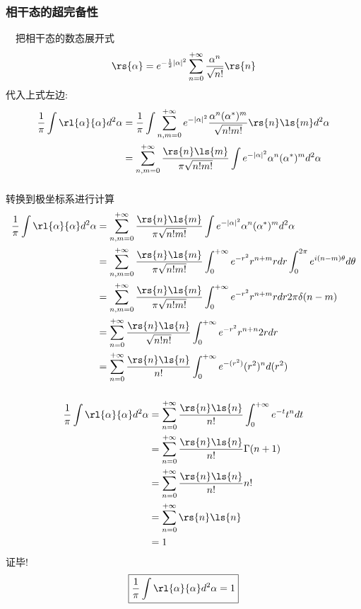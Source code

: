 \begin{frame}
 \frametitle{相干态的超完备性}
 \例[13.试证明相干态具有如下完备性关系]{
    \[ \frac{1}{\pi} \int \rl{\alpha}{\alpha}d ^2 \alpha =1 \] }
 \证 ~ 把相干态的数态展开式
    \[\rs{\alpha} = e^{-\frac{1}{2}\left|\alpha\right|^2}  \sum_{n=0} ^{+\infty}  \frac{\alpha^n}{\sqrt{n!}} \rs{n} \]
 代入上式左边:
 \[
    \begin{aligned}
        \frac{1}{\pi} \int \rl{\alpha}{\alpha}d ^2 \alpha &=  \frac{1}{\pi} \int \sum_{n,m=0} ^{+\infty} e^{-\left|\alpha\right|^2}  
        \frac{\alpha^n(\alpha^*)^m}{\sqrt{n!m!}}  \rs{n}\ls{m }d ^2 \alpha \\
        &= \sum_{n,m=0} ^{+\infty}  \frac{\rs{n}\ls{m }}{\pi \sqrt{ n!m!}}  \int  e^{-\left|\alpha\right|^2}  \alpha^n(\alpha^*)^m  d ^2 \alpha
    \end{aligned}    
 \]    
\end{frame}

\begin{frame}
 \frametitle{}
  转换到极坐标系进行计算
  \[ 
    \begin{aligned}
        \frac{1}{\pi} \int \rl{\alpha}{\alpha}d ^2 \alpha 
        &= \sum_{n,m=0} ^{+\infty}  \frac{\rs{n}\ls{m }}{\pi \sqrt{ n!m!}}  \int  e^{-\left|\alpha\right|^2}  \alpha^n(\alpha^*)^m  d ^2 \alpha \\ 
        &= \sum_{n,m=0} ^{+\infty}  \frac{\rs{n}\ls{m }}{\pi \sqrt{ n!m!}} 
        \int _0 ^ {+\infty}  e^{-r^2}  r^{n+m}  r dr   \int _0 ^ {2 \pi} e^{i(n-m)\theta} d\theta  \\ 
        &= \sum_{n,m=0} ^{+\infty}  \frac{\rs{n}\ls{m }}{\pi \sqrt{ n!m!}} 
        \int _0 ^ {+\infty}  e^{-r^2}  r^{n+m}  r dr   2 \pi \delta(n-m)  \\ 
        &= \sum_{n=0} ^{+\infty}  \frac{\rs{n}\ls{n }}{\sqrt{ n!n!}} 
        \int _0 ^ {+\infty}  e^{-r^2}  r^{n+n}  2r dr  \\ 
        &= \sum_{n=0} ^{+\infty}  \frac{\rs{n}\ls{n }}{n!} 
        \int _0 ^ {+\infty}  e^{-(r^2)}  (r^2)^{n}   d(r^2)  
    \end{aligned}    
 \]        
\end{frame}

\begin{frame}
 \frametitle{}
 \[ 
    \begin{aligned}
        \frac{1}{\pi} \int \rl{\alpha}{\alpha}d ^2 \alpha    
        &= \sum_{n=0} ^{+\infty}  \frac{\rs{n}\ls{n }}{n!} 
        \int _0 ^ {+\infty}  e^{-t}  t^n   dt  \\ 
        &= \sum_{n=0} ^{+\infty}  \frac{\rs{n}\ls{n }}{n!} 
        \Gamma(n+1)  \\ 
        &= \sum_{n=0} ^{+\infty}  \frac{\rs{n}\ls{n }}{n!} 
        n!  \\ 
        &= \sum_{n=0} ^{+\infty}  \rs{n}\ls{n } \\
        &= 1
    \end{aligned}    
 \] 
 证毕!
\[  \boxed{ \frac{1}{\pi} \int \rl{\alpha}{\alpha}d ^2 \alpha =1} \]
\end{frame}

